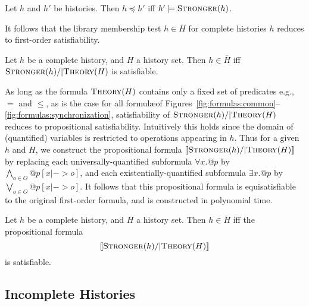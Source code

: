 \begin{lemma}
  \label{lem:stronger_form_complete}
  
  Let $h$ and $h'$ be histories.
  Then $h \preceq h'$ if{f} $h' |= \textsc{Stronger}(h)$.

\end{lemma}

\noindent
It follows that the library membership test $h \in \overline{H}$ for complete
histories $h$ reduces to first-order satisfiability.

\begin{theorem}
  \label{th:satisfiability_pending}

  Let $h$ be a complete history, and $H$ a history set.
  Then $h \in \overline{H}$ if{f}
  $\textsc{Stronger}(h) /| \textsc{Theory}(H)$ is satisfiable.

\end{theorem}

As long as the formula $\textsc{Theory}(H)$ contains only a fixed set of
predicates e.g.,~$=$ and $\leq$, as is the case for all formul\ae of
Figures~\ref{fig:formulas:common}--\ref{fig:formulas:synchronization},
satisfiability of $\textsc{Stronger}(h) /| \textsc{Theory}(H)$ reduces to
propositional satisfiability. Intuitively this holds since the domain of
(quantified) variables is restricted to operations appearing in $h$. Thus for a
given $h$ and $H$, we construct the propositional formula
$[\![{\textsc{Stronger}(h) /| \textsc{Theory}(H)}]\!]$ by replacing each
universally-quantified subformula $\forall x. @p$ by $\bigwedge_{o \in O} @p[x
|-> o]$, and each existentially-quantified subformula $\exists x. @p$ by
$\bigvee_{o \in O} @p[x |-> o]$. It follows that this propositional formula is
equisatisfiable to the original first-order formula, and is constructed in
polynomial time.

\begin{corollary}
  \label{cor:satisfiability_complete}

  Let $h$ be a complete history, and $H$ a history set.
  Then $h \in \overline{H}$ if{f} the propositional formula
  $$[\![{\textsc{Stronger}(h) /| \textsc{Theory}(H)}]\!]$$
  is satisfiable.

\end{corollary}

\subsection{Incomplete Histories}
\label{sec:propositional:pending}

